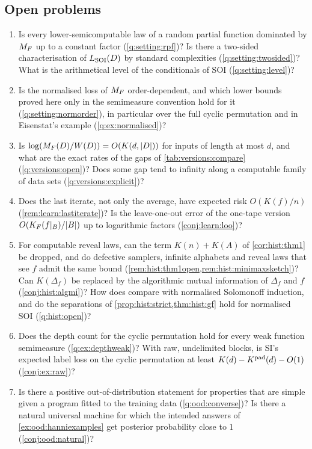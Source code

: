 \subsection{Open problems}\label{sec:discussion:open}

\begin{enumerate}[leftmargin=*,label=(\arabic*)]
\item Is every lower-semicomputable law of a random partial function dominated by $M_{F}$ up to a constant factor (\cref{q:setting:rpf})? Is there a two-sided characterisation of $L_{\mathrm{SOI}}(D)$ by standard complexities (\cref{q:setting:twosided})? What is the arithmetical level of the conditionals of SOI (\cref{q:setting:level})?
\item Is the normalised loss of $M_{F}$ order-dependent, and which lower bounds proved here only in the semimeasure convention hold for it (\cref{q:setting:normorder}), in particular over the full cyclic permutation and in Eisenstat's example (\cref{q:ex:normalised})?
\item Is $\log(M_{F}(D)/W(D))=O(K(d,|D|))$ for inputs of length at most $d$, and what are the exact rates of the gaps of \cref{tab:versions:compare} (\cref{q:versions:open})? Does some gap tend to infinity along a computable family of data sets (\cref{q:versions:explicit})?
\item Does the last iterate, not only the average, have expected risk $O(K(f)/n)$ (\cref{rem:learn:lastiterate})? Is the leave-one-out error of the one-tape version $O(K_{F}(f|_B)/|B|)$ up to logarithmic factors (\cref{conj:learn:loo})?
\item For computable reveal laws, can the term $K(n)+K(A)$ of \cref{cor:hist:thm1} be dropped, and do defective samplers, infinite alphabets and reveal laws that see $f$ admit the same bound (\cref{rem:hist:thm1open,rem:hist:minimaxsketch})? Can $K(\Delta_f)$ be replaced by the algorithmic mutual information of $\Delta_f$ and $f$ (\cref{conj:hist:algmi})? How does \SFIhist{} compare with normalised Solomonoff induction, and do the separations of \cref{prop:hist:strict,thm:hist:gf} hold for normalised SOI (\cref{q:hist:open})?
\item Does the depth count for the cyclic permutation hold for every weak function semimeasure (\cref{q:ex:depthweak})? With raw, undelimited blocks, is SI's expected label loss on the cyclic permutation at least $K(d)-K^{\mathrm{pad}}(d)-O(1)$ (\cref{conj:ex:raw})?
\item Is there a positive out-of-distribution statement for properties that are simple given a program fitted to the training data (\cref{q:ood:converse})? Is there a natural universal machine for which the intended answers of \cref{ex:ood:hanniexamples} get posterior probability close to $1$ (\cref{conj:ood:natural})?

\end{enumerate}
